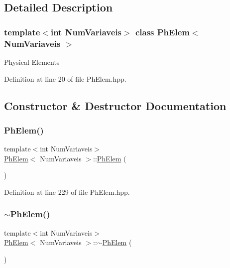 \subsection{Detailed Description}
\subsubsection*{template$<$int Num\+Variaveis$>$\newline
class Ph\+Elem$<$ Num\+Variaveis $>$}

Physical Elements 

Definition at line 20 of file Ph\+Elem.\+hpp.



\subsection{Constructor \& Destructor Documentation}
\mbox{\label{classPhElem_a2c8af1714574b8f72159eacb029101ba}} 
\subsubsection{\texorpdfstring{Ph\+Elem()}{PhElem()}}
{\footnotesize\ttfamily template$<$int Num\+Variaveis$>$ \\
\hyperlink{classPhElem}{Ph\+Elem}$<$ Num\+Variaveis $>$\+::\hyperlink{classPhElem}{Ph\+Elem} (\begin{DoxyParamCaption}{ }\end{DoxyParamCaption})}



Definition at line 229 of file Ph\+Elem.\+hpp.

\mbox{\label{classPhElem_aa08b43c5935f16d4093f3b9b05e06898}} 
\subsubsection{\texorpdfstring{$\sim$\+Ph\+Elem()}{~PhElem()}}
{\footnotesize\ttfamily template$<$int Num\+Variaveis$>$ \\
\hyperlink{classPhElem}{Ph\+Elem}$<$ Num\+Variaveis $>$\+::$\sim$\hyperlink{classPhElem}{Ph\+Elem} (\begin{DoxyParamCaption}{ }\end{DoxyParamCaption})\hspace{0.3cm}{\ttfamily [inline]}}



